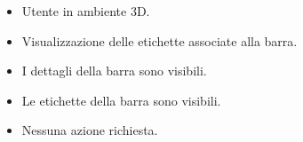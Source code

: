 \UCdsc
{ %
    \begin{itemize}
        \item Utente in ambiente 3D.
    \end{itemize}
}
{ %
    \begin{itemize}
        \item Visualizzazione delle etichette associate alla barra.
    \end{itemize}
}
{ %
    \begin{itemize}
        \item I dettagli della barra sono visibili.
    \end{itemize}
}
{ %
    \begin{itemize}
        \item Le etichette della barra sono visibili.
    \end{itemize}
}
{ %
    \begin{itemize}
        \item Nessuna azione richiesta. 
    \end{itemize}
}


